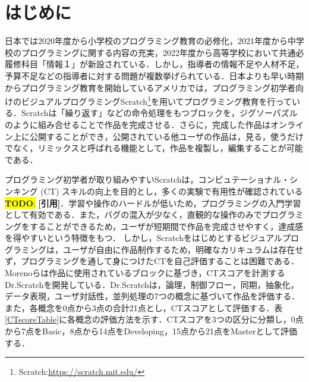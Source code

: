\documentclass[submit,techrep,noauthor]{ipsj}
\newcommand{\todo}[1]{\colorbox{yellow}{{\bf TODO}:}{\color{red} {\textbf{[#1]}}}}
\begin{document}
\section{はじめに}

日本では2020年度から小学校のプログラミング教育の必修化，2021年度から中学校のプログラミングに関する内容の充実，2022年度から高等学校において共通必履修科目「情報１」が新設されている\cite{monkashou}．しかし，指導者の情報不足や人材不足，予算不足などの指導者に対する問題が複数挙げられている\cite{monkashou2}．日本よりも早い時期からプログラミング教育を開始しているアメリカでは，プログラミング初学者向けのビジュアルプログラミングScratch\footnote{Scratch:\url{https://scratch.mit.edu/}}\cite{resnick2009scratch}を用いてプログラミング教育を行っている．Scratchは「繰り返す」などの命令処理をもつブロックを，ジグソーパズルのように組み合せることで作品を完成させる．さらに，完成した作品はオンライン上に公開することができ，公開されている他ユーザの作品は，見る，使うだけでなく，リミックスと呼ばれる機能として，作品を複製し，編集することが可能である．

プログラミング初学者が取り組みやすいScratchは，コンピュテーショナル・シンキング (CT) \cite{wing2006computational}スキルの向上を目的とし，多くの実験で有用性が確認されている\todo{引用}．学習や操作のハードルが低いため，プログラミングの入門学習として有効である．また，バグの混入が少なく，直観的な操作のみでプログラミングをすることができるため，ユーザが短期間で作品を完成させやすく，達成感を得やすいという特徴をもつ．
しかし，Scratchをはじめとするビジュアルプログラミングは，ユーザが自由に作品制作するため，明確なカリキュラムは存在せず，プログラミングを通して身につけたCTを自己評価することは困難である．Morenoらは作品に使用されているブロックに基づき，CTスコアを計測するDr.Scratchを開発している\cite{moreno2015dr}．Dr.Scratchは，論理，制御フロー，同期，抽象化，データ表現，ユーザ対話性，並列処理の7つの概念に基づいて作品を評価する．また，各概念を0点から3点の合計21点とし，CTスコアとして評価する．表\ref{CTscoreTable}に各概念の評価方法を示す．CTスコアを3つの区分に分類し，0点から7点をBasic，8点から14点をDeveloping，15点から21点をMasterとして評価する．
\end{document}
